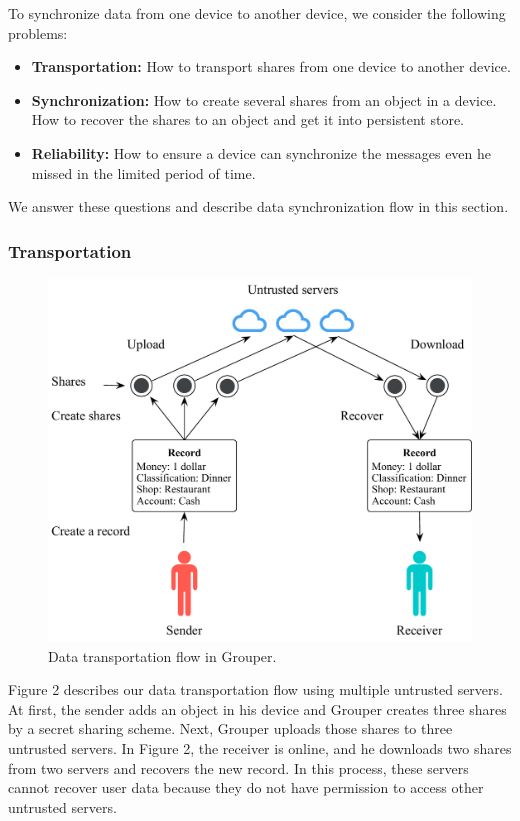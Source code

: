 \documentclass[twocolumn,10pt]{article}
\begin{document}
To synchronize data from one device to another device, we consider the following problems:

\begin{itemize}
	\setlength{\itemsep}{1pt}
	\setlength{\parskip}{0pt}
	\setlength{\parsep}{0pt}
	\item \textbf{Transportation:}
	How to transport shares from one device to another device.
	\item \textbf{Synchronization: } 
	How to create several shares from an object in a device. 
	How to recover the shares to an object and get it into persistent store.
	\item \textbf{Reliability:}
	How to ensure a device can synchronize the messages even he missed in the limited period of time. 
\end{itemize}

We answer these questions and describe data synchronization flow in this section.

\subsubsection{Transportation}

\begin{figure}[t]
	\centering
	\includegraphics[scale=0.42]{sync_flow}
	\caption{Data transportation flow in Grouper.}
\end{figure}

Figure 2 describes our data transportation flow using multiple untrusted servers. 
At first, the sender adds an object in his device and Grouper creates three shares by a secret sharing scheme. 
Next, Grouper uploads those shares to three untrusted servers. 
In Figure 2, the receiver is online, and he downloads two shares from two servers and recovers the new record. 
In this process, these servers cannot recover user data because they do not have permission to access other untrusted servers. 
\end{document}
